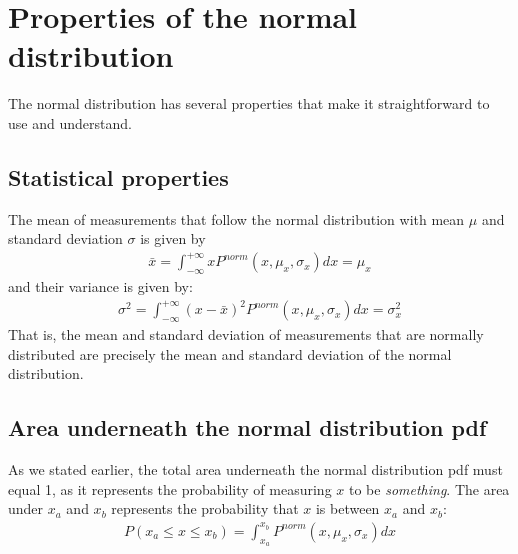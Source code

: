 \section{Properties of the normal distribution}
The normal distribution has several properties that make it straightforward to use and understand.
\subsection{Statistical properties}
The mean of measurements that follow the normal distribution with mean $\mu$ and standard deviation $\sigma$ is given by
\begin{align}
\bar x = \int_{-\infty}^{+\infty}xP^{norm}(x,\mu_x,\sigma_x)dx=\mu_x
\end{align}
and their variance is given by:
\begin{align}
\sigma^2 = \int_{-\infty}^{+\infty}(x-\bar x)^2P^{norm}(x,\mu_x,\sigma_x)dx=\sigma_x^2
\end{align}
That is, the mean and standard deviation of measurements that are normally distributed are precisely the mean and standard deviation of the normal distribution.

\subsection{Area underneath the normal distribution pdf}
As we stated earlier, the total area underneath the normal distribution pdf must equal 1, as it represents the probability of measuring $x$ to be \textit{something}. The area under $x_a$ and $x_b$ represents the probability that $x$ is between $x_a$ and $x_b$:
\begin{align}
P(x_a \leq x \leq x_b) = \int_{x_a}^{x_b}P^{norm}(x,\mu_x,\sigma_x)dx
\end{align}

